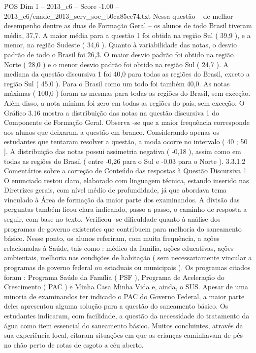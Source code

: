 \begin{textsample}{POS Dim 1 – 2013\_c6 – Score -1.00 – 2013\_c6/enade\_2013\_serv\_soc\_b0ca85ce74.txt}
Nessa questão – de melhor desempenho dentre as duas de Formação Geral – os alunos de todo Brasil tiveram média, 37,7.
A maior média para a questão 1 foi obtida na região Sul ( 39,9 ), e a menor, na região Sudeste ( 34,6 ).
Quanto à variabilidade das notas, o desvio padrão de todo o Brasil foi 26,3.
O maior desvio padrão foi obtido na região Norte ( 28,0 ) e o menor desvio padrão foi obtido na região Sul ( 24,7 ).
A mediana da questão discursiva 1 foi 40,0 para todas as regiões do Brasil, exceto a região Sul ( 45,0 ).
Para o Brasil como um todo foi também 40,0.
As notas máximas ( 100,0 ) foram as mesmas para todas as regiões do Brasil, sem exceção.
Além disso, a nota mínima foi zero em todas as regiões do país, sem exceção.
O Gráfico 3.16 mostra a distribuição das notas na questão discursiva 1 do Componente de Formação Geral.
Observa -se que a maior frequência corresponde aos alunos que deixaram a questão em branco.
Considerando apenas os estudantes que tentaram resolver a questão, a moda ocorre no intervalo ( 40 ; 50 ].
A distribuição das notas possui assimetria negativa ( -0,18 ), assim como em todas as regiões do Brasil ( entre -0,26 para o Sul e -0,03 para o Norte ). 3.3.1.2 Comentários sobre a correção de Conteúdo das respostas à Questão Discursiva 1 O enunciado restou claro, elaborado com linguagem técnica, estando inserido nas Diretrizes gerais, com nível médio de profundidade, já que abordava tema vinculado à Área de formação da maior parte dos examinandos.
A divisão das perguntas também ficou clara indicando, passo a passo, o caminho de resposta a seguir, com base no texto.
Verificou -se dificuldade quanto à análise dos programas de governo existentes que contribuem para melhoria do saneamento básico.
Nesse ponto, os alunos referiram, com muita frequência, a ações relacionadas à Saúde, tais como : médico da família, ações educativas, ações ambientais, melhoria nas condições de habitação ( sem necessariamente vincular a programas de governo federal ou estaduais ou municipais ).
Os programas citados foram : Programa Saúde da Família ( PSF ), Programa de Aceleração do Crescimento ( PAC ) e Minha Casa Minha Vida e, ainda, o SUS.
Apesar de uma minoria de examinandos ter indicado o PAC do Governo Federal, a maior parte deles apresentou alguma solução para a questão do saneamento básico.
Os estudantes indicaram, com facilidade, a questão da necessidade do tratamento da água como item essencial do saneamento básico.
Muitos concluintes, através da sua experiência local, citaram situações em que as crianças caminhavam de pés no chão perto de rotas de esgoto a céu aberto.

\end{textsample}
